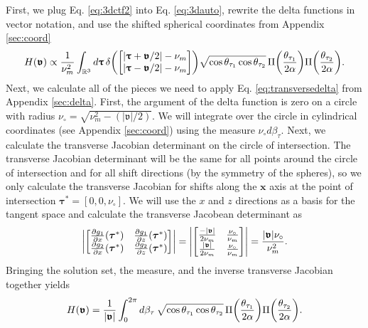 \documentclass[]{osa-article}
\let\originalleft\left
\let\originalright\right
\renewcommand{\left}{\mathopen{}\mathclose\bgroup\originalleft}
\renewcommand{\right}{\aftergroup\egroup\originalright}
\providecommand{\mb}[1]{\mathbf{#1}}
\providecommand{\mbb}[1]{\mathbb{#1}}
\providecommand{\bs}[1]{\boldsymbol{#1}}
\providecommand{\bv}{\boldsymbol{\mathfrak{v}}}
\providecommand{\bt}{\bs{\uptau}}
\begin{document}
First, we plug Eq. \eqref{eq:3dctf2} into Eq. \eqref{eq:3dauto}, rewrite the delta functions in vector notation, and use the shifted spherical coordinates from Appendix \ref{sec:coord}
\begin{align}
  H(\bv) \propto \frac{1}{\nu_m^2}\int_{\mbb{R}^3}d\bt\,\delta\left(\begin{bmatrix}|\bt + \bv/2| - \nu_m\\ |\bt - \bv/2| - \nu_m \end{bmatrix}\right)\sqrt{\cos\theta_{\tau_1}\cos\theta_{\tau_2}}\,\Pi\left(\frac{\theta_{\tau_1}}{2\alpha}\right)\Pi\left(\frac{\theta_{\tau_2}}{2\alpha}\right).
\end{align}
Next, we calculate all of the pieces we need to apply Eq. \eqref{eq:transversedelta} from Appendix \ref{sec:delta}. First, the argument of the delta function is zero on a circle with radius $\nu_\circ = \sqrt{\nu_m^2 - (|\bv|/2)}$. We will integrate over the circle in cylindrical coordinates (see Appendix \ref{sec:coord}) using the measure $\nu_\circ d\beta_\tau$. Next, we calculate the transverse Jacobian determinant on the circle of intersection. The transverse Jacobian determinant will be the same for all points around the circle of intersection and for all shift directions (by the symmetry of the spheres), so we only calculate the transverse Jacobian for shifts along the $\mb{x}$ axis at the point of intersection $\bs{\tau}^* = [0, 0, \nu_\circ]$. We will use the $x$ and $z$ directions as a basis for the tangent space and calculate the transverse Jacobean determinant as
\begin{align}
  \left|\begin{bmatrix}\frac{\partial g_1}{\partial x}(\bs{\tau}^*)&\frac{\partial g_1}{\partial z}(\bs{\tau}^*)\\\frac{\partial g_2}{\partial x}(\bs{\tau}^*)&\frac{\partial g_2}{\partial z}(\bs{\tau}^*)\end{bmatrix}\right| = \left|\begin{bmatrix}\frac{-|\bv|}{2\nu_m}&\frac{\nu_\circ}{\nu_m}\\\frac{|\bv|}{2\nu_m}&\frac{\nu_\circ}{\nu_m}\end{bmatrix}\right| = \frac{|\bv|\nu_\circ}{\nu_m^2}.
\end{align}
Bringing the solution set, the measure, and the inverse transverse Jacobian together yields
\begin{align}
  H(\bv) = \frac{1}{|\bv|}\int_0^{2\pi} d\beta_\tau\,\sqrt{\cos\theta_{\tau_1}\cos\theta_{\tau_2}}\,\Pi\left(\frac{\theta_{\tau_1}}{2\alpha}\right)\Pi\left(\frac{\theta_{\tau_2}}{2\alpha}\right).\label{eq:lastform}
\end{align}
\end{document}
